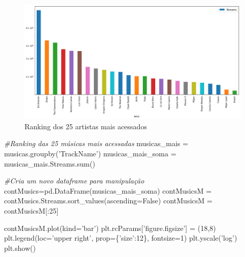 \documentclass[11pt]{article}
\makeatletter
\def\maxwidth{\ifdim\Gin@nat@width>\linewidth\linewidth
    \else\Gin@nat@width\fi}
\let\Oldincludegraphics\includegraphics
\renewcommand{\includegraphics}[1]{\Oldincludegraphics[width=.8\maxwidth]{#1}}
\newenvironment{Shaded}{}{}
\newcommand{\DecValTok}[1]{\textcolor[rgb]{0.25,0.63,0.44}{{#1}}}
\newcommand{\StringTok}[1]{\textcolor[rgb]{0.25,0.44,0.63}{{#1}}}
\newcommand{\CommentTok}[1]{\textcolor[rgb]{0.38,0.63,0.69}{\textit{{#1}}}}
\newcommand{\NormalTok}[1]{{#1}}
\newcommand{\VariableTok}[1]{\textcolor[rgb]{0.10,0.09,0.49}{{#1}}}
\newcommand{\OperatorTok}[1]{\textcolor[rgb]{0.40,0.40,0.40}{{#1}}}
\newcommand{\BuiltInTok}[1]{{#1}}
\makeatother
\begin{document}
\begin{figure}
\centering
\includegraphics{output_9_0.png}
\caption{Ranking dos 25 artistas mais acessados}
\end{figure}

\begin{Shaded}
\begin{Highlighting}[]

\CommentTok{#Ranking das 25 músicas mais acessadas}
\NormalTok{musicas_mais }\OperatorTok{=}\NormalTok{ musicas.groupby(}\StringTok{'TrackName'}\NormalTok{)}
\NormalTok{musicas_mais_soma }\OperatorTok{=}\NormalTok{ musicas_mais.Streams.}\BuiltInTok{sum}\NormalTok{()}

\CommentTok{#Cria um novo dataframe para manipulação}
\NormalTok{contMusics}\OperatorTok{=}\NormalTok{pd.DataFrame(musicas_mais_soma)}
\NormalTok{contMusicsM }\OperatorTok{=}\NormalTok{ contMusics.Streams.sort_values(ascending}\OperatorTok{=}\VariableTok{False}\NormalTok{)}
\NormalTok{contMusicsM }\OperatorTok{=}\NormalTok{ contMusicsM[:}\DecValTok{25}\NormalTok{]}

\NormalTok{contMusicsM.plot(kind}\OperatorTok{=}\StringTok{'bar'}\NormalTok{)}
\NormalTok{plt.rcParams[}\StringTok{'figure.figsize'}\NormalTok{] }\OperatorTok{=}\NormalTok{ (}\DecValTok{18}\NormalTok{,}\DecValTok{8}\NormalTok{)}
\NormalTok{plt.legend(loc}\OperatorTok{=}\StringTok{'upper right'}\NormalTok{, prop}\OperatorTok{=}\NormalTok{\{}\StringTok{'size'}\NormalTok{:}\DecValTok{12}\NormalTok{\}, fontsize}\OperatorTok{=}\DecValTok{1}\NormalTok{)}
\NormalTok{plt.yscale(}\StringTok{'log'}\NormalTok{)}
\NormalTok{plt.show()}
\end{Highlighting}
\end{Shaded}
\end{document}
